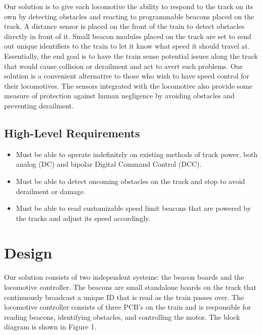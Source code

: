 \documentclass[openbib,letterpaper,10pt]{article}
\begin{document}
\begin{spacing}{1.15}
Our solution is to give each locomotive the ability to respond to the track on its own by detecting obstacles and reacting to programmable beacons placed on the track. A distance sensor is placed on the front of the train to detect obstacles directly in front of it. Small beacon modules placed on the track are set to send out unique identifiers to the train to let it know what speed it should travel at. Essentially, the end goal is to have the train sense potential issues along the track that would cause collision or derailment and act to avert such problems. Our solution is a convenient alternative to those who wish to have speed control for their locomotives. The sensors integrated with the locomotive also provide some measure of protection against human negligence by avoiding obstacles and preventing derailment.

\subsection{High-Level Requirements}
\begin{itemize}
	\item Must be able to operate indefinitely on existing methods of track power, both analog (DC) and bipolar Digital Command Control (DCC).
	\item Must be able to detect oncoming obstacles on the track and stop to avoid derailment or damage.
	\item Must be able to read customizable speed limit beacons that are powered by the tracks and adjust its speed accordingly.
\end{itemize}

\clearpage

\section{Design}
Our solution consists of two independent systems: the beacon boards and the locomotive controller. The beacons are small standalone boards on the track that continuously broadcast a unique ID that is read as the train passes over. The locomotive controller consists of three PCB's on the train and is responsible for reading beacons, identifying obstacles, and controlling the motor. The block diagram is shown in Figure 1.


\end{spacing}
\end{document}
